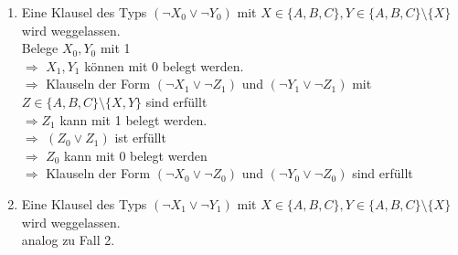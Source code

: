 \documentclass[a4paper,10pt]{article}
\begin{document}
\begin{enumerate}
\begin{enumerate}[1.]
\begin{enumerate}
				\item Eine Klausel des Typs $(\lnot X_0 \lor \lnot Y_0)$ mit $X \in \{A,B,C\}, Y \in \{A,B,C \}\setminus\{X\}$ wird weggelassen.\\
				Belege $X_0, Y_0$ mit 1 \\
				$\Rightarrow$ $X_1, Y_1$ können mit 0 belegt werden. \\
				$\Rightarrow$ Klauseln der Form $(\lnot X_1 \lor \lnot Z_1)$ und $(\lnot Y_1 \lor \lnot Z_1)$ mit $Z \in \{A,B,C\}\setminus\{X,Y\}$ sind erfüllt\\
				$\Rightarrow Z_1$ kann mit 1 belegt werden.\\
				$\Rightarrow$ $(Z_0 \lor Z_1)$ ist erfüllt\\
				$\Rightarrow$ $Z_0 $ kann mit 0 belegt werden \\
				$\Rightarrow$ Klauseln der Form $(\lnot X_0 \lor \lnot Z_0)$ und $(\lnot Y_0 \lor \lnot Z_0)$ sind erfüllt \\
				\item Eine Klausel des Typs $(\lnot X_1 \lor \lnot Y_1)$ mit $X \in \{A,B,C\}, Y \in \{A,B,C \}\setminus\{X\}$ wird weggelassen.\\
				analog zu Fall 2.


\end{enumerate}
\end{enumerate}
\end{enumerate}
\end{document}
